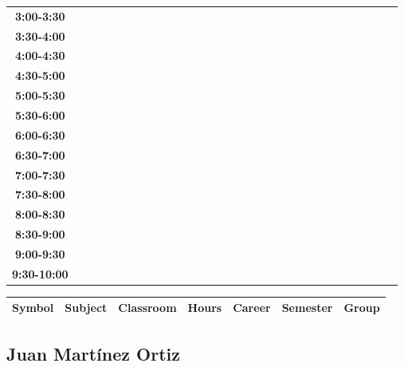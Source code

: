 \documentclass{article}
\begin{document}
\begin{table}[ht]
\begin{tabular}{|c|c|c|c|c|c|c|c|c|c|c|c|c|c|c|c|c|c|c|c|c|c|c|c|c|c|c|c|c|c|}
\textbf{3:00-3:30} &   &   &   &   &   &   &   \\
 \cline{1-8} 
\textbf{3:30-4:00} &   &   &   &   &   &   &   \\
 \cline{1-8} 
\textbf{4:00-4:30} &   &   &   &   &   &   &   \\
 \cline{1-8} 
\textbf{4:30-5:00} &   &   &   &   &   &   &   \\
 \cline{1-8} 
\textbf{5:00-5:30} &   &   &   &   &   &   &   \\
 \cline{1-8} 
\textbf{5:30-6:00} &   &   &   &   &   &   &   \\
 \cline{1-8} 
\textbf{6:00-6:30} &   &   &   &   &   &   &   \\
 \cline{1-8} 
\textbf{6:30-7:00} &   &   &   &   &   &   &   \\
 \cline{1-8} 
\textbf{7:00-7:30} &   &   &   &   &   &   &   \\
 \cline{1-8} 
\textbf{7:30-8:00} &   &   &   &   &   &   &   \\
 \cline{1-8} 
\textbf{8:00-8:30} &   &   &   &   &   &   &   \\
 \cline{1-8} 
\textbf{8:30-9:00} &   &   &   &   &   &   &   \\
 \cline{1-8} 
\textbf{9:00-9:30} &   &   &   &   &   &   &   \\
 \cline{1-8} 
\textbf{9:30-10:00} &   &   &   &   &   &   &   \\
 \cline{1-8} 
\end{tabular}\end{table}

        
        \begin{tabular}{|>{\centering\arraybackslash}m{2cm}|>{\centering\arraybackslash}m{4cm}|>{\centering\arraybackslash}m{2cm}|>{\centering\arraybackslash}m{2cm}|>{\centering\arraybackslash}m{2cm}|>{\centering\arraybackslash}m{2cm}|>{\centering\arraybackslash}m{2cm}|}
        \hline
        \textbf{Symbol} & \textbf{Subject} & \textbf{Classroom} & \textbf{Hours} & \textbf{Career} & \textbf{Semester} & \textbf{Group} \\
        \hline
        \end{tabular}
                    

        \newpage
        

        \subsection{Juan Mart\'inez Ortiz}
        \vspace*{.1cm}
        
\end{document}
